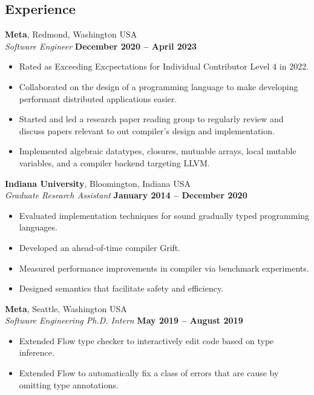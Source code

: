 \documentclass[resmargin,line]{res}
\begin{document}
\begin{resume}

\section{\sc Experience}

{\bf Meta}, Redmond, Washington USA\\
{\em Software Engineer} \hfill {\bf December 2020 -- April 2023}\\
%
\begin{itemize}
\vspace*{-.3cm}
\item Rated as Exceeding Excpectations for Individual Contributor Level 4 in 2022.  
\item Collaborated on the design of a programming language to make developing performant distributed applications easier.
\item Started and led a research paper reading group to regularly review and discuss papers relevant to out compiler's design and implementation.
\item Implemented algebraic datatypes, closures, mutuable arrays, local mutable variables, and a compiler backend targeting LLVM.
\end{itemize}

{\bf Indiana University}, Bloomington, Indiana USA\\
{\em Graduate Research Assistant} \hfill {\bf January 2014 -- December 2020}\\
%
\begin{itemize}
\vspace*{-.3cm}
\item Evaluated implementation techniques for sound gradually typed
  programming languages.
\item Developed an ahead-of-time compiler Grift.
\item Measured performance improvements in compiler via benchmark experiments.
\item Designed semantics that facilitate safety and efficiency.
\end{itemize}

{\bf Meta}, Seattle, Washington USA\\
{\em Software Engineering Ph.D. Intern} \hfill {\bf May 2019 -- August 2019}\\
%
\begin{itemize}
\vspace*{-.3cm}
\item Extended Flow type checker to interactively edit code based on type inference.
\item Extended Flow to automatically fix a class of errors that are cause by omitting
  type annotations.
\end{itemize}


\end{resume}
\end{document}
